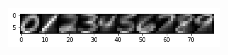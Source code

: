 \documentclass[letterpaper]{article}
\begin{document}
\begin{figure}[H]
\centering
\includegraphics[width=0.5\textwidth]{eta_plot.png}
\caption{\label{}}
\end{figure}











\end{document}
